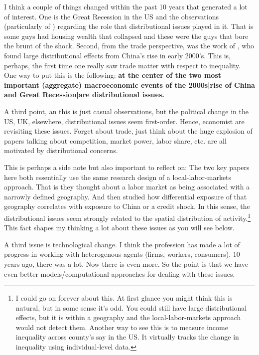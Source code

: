 \documentclass[pdftex,12pt]{article}
\begin{document}
\medskip
\noindent I think a couple of things changed within the past 10 years that generated a lot of interest. One is the Great Recession in the US and the observations (particularly of \citet{mian2014explains}) regarding the role that distributional issues played in it. That is some guys had housing wealth that collapsed and these were the guys that bore the brunt of the shock. Second, from the trade perspective, was the work of \citet{david2013china}, who found large distributional effects from China's rise in early 2000's. This is, perhaps, the first time one really saw trade matter with respect to inequality. One way to put this is the following: \textbf{at the center of the two most important (aggregate) macroeconomic events of the 2000s|rise of China and Great Recession|are distributional issues.}

\medskip
\noindent A third point, an this is just casual observations, but the political change in the US, UK, elsewhere, distributional issues seem first-order. Hence, economist are revisiting these issues. Forget about trade, just think about the huge explosion of papers talking about competition, market power, labor share, etc. are all motivated by distributional concerns.

\medskip
\noindent This is perhaps a side note but also important to reflect on: The two key papers here both essentially use the same research design of a local-labor-markets approach. That is they thought about a labor market as being associated with a narrowly defined geography. And then studied how differential exposure of that geography correlates with exposure to China or a credit shock. In this sense, the distributional issues seem strongly related to the spatial distribution of activity.\footnote{I could go on forever about this. At first glance you might think this is natural, but in some sense it's odd. You could still have large distributional effects, but it is within a geography and the local-labor-markets approach would not detect them. Another way to see this is to measure income inequality across county's say in the US. It virtually tracks the change in inequality using individual-level data.} This fact shapes my thinking a lot about these issues as you will see below.

\medskip
\noindent A third issue is technological change. I think the profession has made a lot of progress in working with heterogenous agents (firms, workers, consumers). 10 years ago, there was a lot. Now there is even more. So the point is that we have even better models/computational approaches for dealing with these issues.
\end{document}
